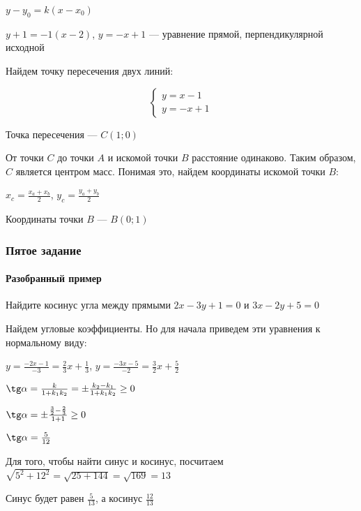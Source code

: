 \documentclass{article}
\begin{document}
\begin{flushleft}
$y - y_0 = k(x - x_0)$

$y + 1 = -1 (x - 2)$, $y = -x + 1$ — уравнение прямой, перпендикулярной исходной

\bigskip

Найдем точку пересечения двух линий:

\begin{equation}
    \begin{cases}
        y = x - 1 \\
        y = -x + 1
    \end{cases}
\end{equation}

Точка пересечения — $C(1; 0)$

От точки $C$ до точки $A$ и искомой точки $B$ расстояние одинаково. Таким образом, $C$ является центром масс. Понимая это, найдем координаты искомой точки $B$:

\hspace{5mm} $x_c = \frac{x_a + x_b}{2}$, $y_c = \frac{y_a + y_b}{2}$

Координаты точки $B$ — $B(0; 1)$

\pagebreak
\subsubsection{Пятое задание}

\paragraph{Разобранный пример}

Найдите косинус угла между прямыми $2x - 3y + 1 = 0$ и $3x - 2y + 5 = 0$

Найдем угловые коэффициенты. Но для начала приведем эти уравнения к нормальному виду:

$y = \frac{-2x - 1}{-3} = \frac{2}{3}x + \frac{1}{3}$, $y = \frac{-3x - 5}{-2} = \frac{3}{2}x + \frac{5}{2}$

\bigskip

$\tg \alpha = \frac{k}{1 + k_1 k_2} = \pm \frac{k_2 - k_1}{1 + k_1 k_2} \ge 0$

$\tg \alpha = \pm \frac{\frac{3}{2} - \frac{2}{3}}{1 + 1} \ge 0$

$\tg \alpha = \frac{5}{12}$

\bigskip

Для того, чтобы найти синус и косинус, посчитаем $\sqrt{5^2 + 12^2} = \sqrt{25 + 144} = \sqrt{169} = 13$

Синус будет равен $\frac{5}{13}$, а косинус $\frac{12}{13}$


\end{flushleft}
\end{document}
